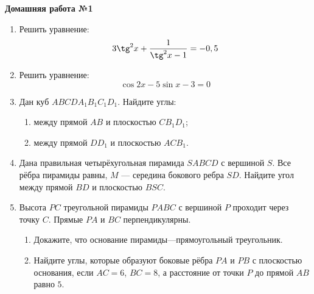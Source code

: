 \documentclass[12pt, a5paper]{article}
\begin{document}
	
   \cfoot{}
\begin{center}
	\Large
	\textbf{Домашняя работа №1}
\end{center}
\begin{enumerate}[label=\textbf{\arabic*.}]
	\item {} Решить уравнение: $$3\tg^2 x + \dfrac{1}{\tg^2 x - 1}=-0,5$$
	\item {} Решить уравнение: $$\cos 2x - 5\sin x - 3 = 0$$
	\item {} Дан куб $ABCDA_1B_1C_1D_1$. Найдите углы:
	\begin{enumerate}[label=\asbuk*)]
		\item между прямой $AB$ и плоскостью $CB_1D_1$;
		\item между прямой $DD_1$ и плоскостью $ACB_1$.
	\end{enumerate}
	\item {} Дана правильная четырёхугольная пирамида $SABCD$ с вершиной $S$. Все рёбра пирамиды равны, $M$ --- середина бокового ребра $SD$. Найдите угол между прямой $BD$ и плоскостью $BSC$.
	\item {} Высота $PC$ треугольной пирамиды $PABC$ с вершиной $P$ проходит через точку $C$. Прямые $PA$ и $BC$ перпендикулярны.
	\begin{enumerate}[label=\asbuk*)]
		\item Докажите, что основание пирамиды—прямоугольный треугольник.
		\item Найдите углы, которые образуют боковые рёбра $PA$ и $PB$ с плоскостью основания, если $AC = 6$, $BC = 8$, а расстояние от точки $P$ до прямой $AB$ равно $5$.
	\end{enumerate}
\end{enumerate}
\end{document}
